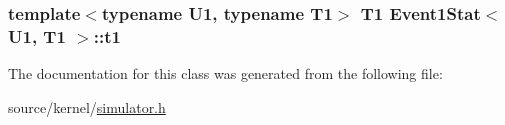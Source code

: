 \hypertarget{classEvent1Stat_d8c7245671d807e6ffe5fefb08a1345c}{
\subsubsection[{t1}]{\setlength{\rightskip}{0pt plus 5cm}template$<$typename U1, typename T1$>$ T1 {\bf Event1Stat}$<$ U1, T1 $>$::{\bf t1}}}
\label{classEvent1Stat_d8c7245671d807e6ffe5fefb08a1345c}




The documentation for this class was generated from the following file:\begin{CompactItemize}
\item 
source/kernel/\hyperlink{simulator_8h}{simulator.h}\end{CompactItemize}
